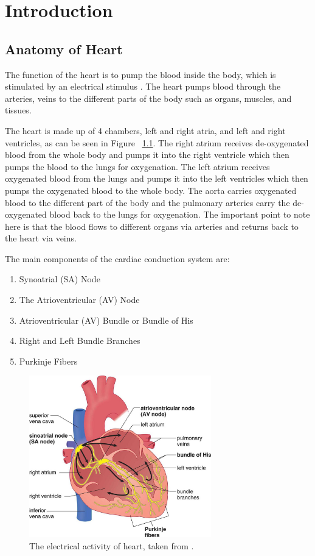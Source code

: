 \chapter{Introduction}


\section{Anatomy of Heart}
The function of the heart is to pump the blood inside the body, which is stimulated by an electrical stimulus \cite{wilkins2005ecg} \cite{electric_activity_heart}. The heart pumps blood through the arteries, veins to the different parts of the body such as organs, muscles, and tissues.

The heart is made up of 4 chambers, left and right atria, and left and right ventricles, as can be seen in Figure ~\ref{fig:heart_anatomy}. The right atrium receives de-oxygenated blood from the whole body and pumps it into the right ventricle which then pumps the blood to the lungs for oxygenation. The left atrium receives oxygenated blood from the lungs and pumps it into the left ventricles which then pumps the oxygenated blood to the whole body. The aorta carries oxygenated blood to the different part of the body and the pulmonary arteries carry the de-oxygenated blood back to the lungs for oxygenation. The important point to note here is that the blood flows to different organs via arteries and returns back to the heart via veins.

The main components of the cardiac conduction system are:
\begin{enumerate}
	\item Synoatrial (SA) Node
	\item The Atrioventricular (AV) Node
	\item Atrioventricular (AV) Bundle or Bundle of His
	\item Right and Left Bundle Branches
	\item Purkinje Fibers
\end{enumerate}


\begin{figure}[htpb]
	\centering
	\includegraphics[width=\textwidth,height=7cm,keepaspectratio=true]{images/electric_activity_heart}
	\caption{
		The electrical activity of heart, taken from \cite{electric_activity_heart}.
	}
	\label{fig:heart_anatomy}
\end{figure}





